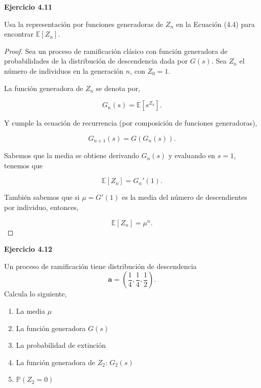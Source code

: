 \documentclass{article}
\begin{document}
\textbf{Ejercicio 4.11}

Usa la representación por funciones generadoras de $Z_n$ en la Ecuación (4.4) para encontrar $\mathbb{E}[Z_n]$.

\begin{proof}
Sea un proceso de ramificación clásico con función generadora de probabilidades de la distribución de descendencia dada por $G(s)$. Sea $Z_n$ el número de individuos en la generación $n$, con $Z_0 = 1$.

La función generadora de $Z_n$ se denota por,

\[
G_n(s) = \mathbb{E}[s^{Z_n}].
\]

Y cumple la ecuación de recurrencia (por composición de funciones generadoras),

\[
G_{n+1}(s) = G(G_n(s)).
\]

Sabemos que la media se obtiene derivando $G_n(s)$ y evaluando en $s = 1$, tenemos que

\[
\mathbb{E}[Z_n] = G_n'(1).
\]

También sabemos que si $\mu = G'(1)$ es la media del número de descendientes por individuo, entonces,

\[
\mathbb{E}[Z_n] = \mu^n.
\]
\end{proof}

\textbf{Ejercicio 4.12}

Un proceso de ramificación tiene distribución de descendencia
\[
\mathbf{a} = \left( \frac{1}{4}, \frac{1}{4}, \frac{1}{2} \right).
\]
Calcula lo siguiente,

\begin{enumerate}
\item[(a)] La media \( \mu \)
\item[(b)] La función generadora \( G(s) \)
\item[(c)] La probabilidad de extinción
\item[(d)] La función generadora de \( Z_2 \): \( G_2(s) \)
\item[(e)] \( \mathbb{P}(Z_2 = 0) \)
\end{enumerate}
\end{document}
